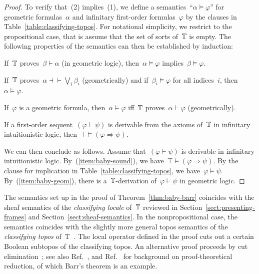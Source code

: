 \documentclass{ws-rv9x6}
\begin{document}
{\begin{proof}
To verify that~(2) implies~(1), we define a semantics~``$\alpha \models
\varphi$'' for geometric formulas~$\alpha$ and infinitary first-order
formulas~$\varphi$ by the clauses in Table~\ref{table:classifying-topos}. For
notational simplicity, we restrict to the propositional case, that is assume that the set of
sorts of~$\mathbb{T}$ is empty.
The following properties of the semantics can then be established by induction:
\begin{alphlist}[(d)]
\item If~$\mathbb{T}$ proves~$\beta \vdash \alpha$ (in geometric logic), then~$\alpha \models \varphi$ implies~$\beta
\models \varphi$.
\item If~$\mathbb{T}$ proves~$\alpha \dashv\vdash \bigvee_i \beta_i$ (geometrically) and if~$\beta_i \models \varphi$ for
all indices~$i$, then~$\alpha \models \varphi$.
\item\label{item:baby-geom} If~$\varphi$ is a geometric formula, then~$\alpha
\models \varphi$ iff~$\mathbb{T}$ proves~$\alpha \vdash \varphi$ (geometrically).
\item\label{item:baby-sound} If a first-order sequent~$(\varphi \vdash \psi)$
is derivable from the axioms of~$\mathbb{T}$ in infinitary intuitionistic logic,
then~$\top \models (\varphi \Rightarrow \psi)$.
\end{alphlist}
We can then conclude as follows. Assume that~$(\varphi \vdash \psi)$
is derivable in infinitary intuitionistic logic. By~(\ref{item:baby-sound}), we
have~$\top \models (\varphi \Rightarrow \psi)$. By the clause for implication
in Table~\ref{table:classifying-topos}, we have~$\varphi \models \psi$.
By~(\ref{item:baby-geom}), there is a~$\mathbb{T}$-derivation of~$\varphi \vdash
\psi$ in geometric logic.
\end{proof}

\begin{remark}The semantics set up in the proof of Theorem~\ref{thm:baby-barr}
coincides with the sheaf semantics of the \emph{classifying locale} of~$\mathbb{T}$
reviewed in Section~\ref{sect:presenting-frames} and
Section~\ref{sect:sheaf-semantics}. In the nonpropositional case, the semantics
coincides with the slightly more general topos semantics of the
\emph{classifying topos} of~$\mathbb{T}$~\cite[Section~2]{caramello:tst}. The local
operator defined in the proof cuts out a certain Boolean subtopos of the
classifying topos. An alternative proof proceeds by cut
elimination~\cite[Section~6]{rathjen:barr}; see also
Ref.~, and
Ref.~ for background on proof-theoretical
reduction, of which Barr's theorem is an example.
\end{remark}

}
\end{document}
